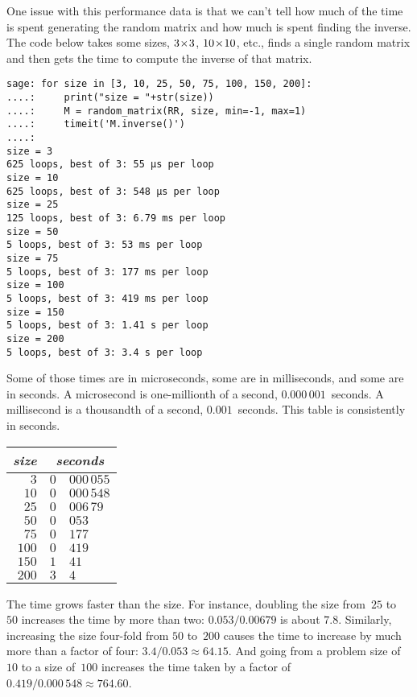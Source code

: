 One issue with this performance data is that
we can't tell
how much of the time is spent generating
the random matrix and how much is spent finding the inverse.
The code below takes some sizes, $3 \! \times \! 3$, $10 \! \times \! 10$, etc.,
finds a single random matrix and then 
gets the time to compute the inverse of that matrix.
\begin{lstlisting}
sage: for size in [3, 10, 25, 50, 75, 100, 150, 200]:
....:     print("size = "+str(size))
....:     M = random_matrix(RR, size, min=-1, max=1)
....:     timeit('M.inverse()')
....:     
size = 3
625 loops, best of 3: 55 μs per loop
size = 10
625 loops, best of 3: 548 μs per loop
size = 25
125 loops, best of 3: 6.79 ms per loop
size = 50
5 loops, best of 3: 53 ms per loop
size = 75
5 loops, best of 3: 177 ms per loop
size = 100
5 loops, best of 3: 419 ms per loop
size = 150
5 loops, best of 3: 1.41 s per loop
size = 200
5 loops, best of 3: 3.4 s per loop
\end{lstlisting}
Some of those times are in microseconds, some are in milliseconds, and some
are in seconds.
A microsecond is one-millionth of a second,
$0.000\,001$~seconds.
A millisecond is a thousandth of a second,
$0.001$~seconds.
This table is consistently in seconds.
\begin{center}
  \begin{tabular}{r|r@{.}l}
    \multicolumn{1}{r}{\textit{size}}     &\multicolumn{2}{c}{\textit{seconds}}  \\  \hline
    $3$      &$0$ &$000\,055$ \\
    $10$     &$0$ &$000\,548$ \\
    $25$     &$0$ &$006\,79$ \\
    $50$     &$0$ &$053$ \\
    $75$     &$0$ &$177$ \\
    $100$    &$0$ &$419$ \\
    $150$    &$1$ &$41$ \\
    $200$    &$3$ &$4$ 
  \end{tabular}
\end{center}
The time grows faster than the size.
For instance, doubling the size from~$25$ to~$50$ increases the time by
more than two: $0.053/0.00679$ is about $7.8$.
Similarly, increasing the size four-fold from $50$ to~$200$ causes the time to 
increase by much more than a factor of four: $3.4/0.053\approx 64.15$.
And going from a problem size of~$10$ to a size of~$100$ 
increases the time taken by a factor of $0.419/0.000\,548\approx 764.60$. 

